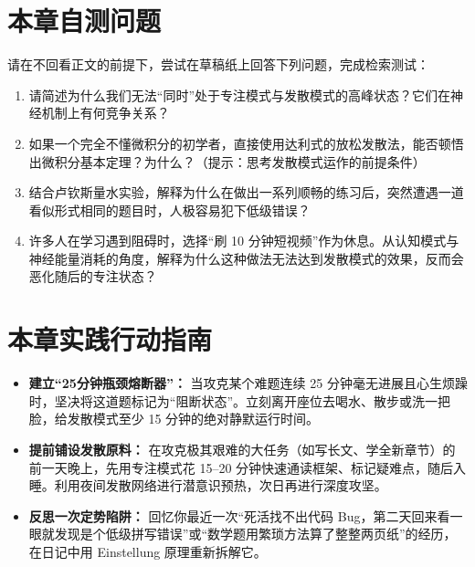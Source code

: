 \documentclass[12pt,a4paper,openany]{ctexbook}
\begin{document}
\section*{本章自测问题}
请在不回看正文的前提下，尝试在草稿纸上回答下列问题，完成检索测试：
\begin{enumerate}
    \item 请简述为什么我们无法“同时”处于专注模式与发散模式的高峰状态？它们在神经机制上有何竞争关系？
    \item 如果一个完全不懂微积分的初学者，直接使用达利式的放松发散法，能否顿悟出微积分基本定理？为什么？（提示：思考发散模式运作的前提条件）
    \item 结合卢钦斯量水实验，解释为什么在做出一系列顺畅的练习后，突然遭遇一道看似形式相同的题目时，人极容易犯下低级错误？
    \item 许多人在学习遇到阻碍时，选择“刷 10 分钟短视频”作为休息。从认知模式与神经能量消耗的角度，解释为什么这种做法无法达到发散模式的效果，反而会恶化随后的专注状态？
\end{enumerate}

\section*{本章实践行动指南}
\begin{practicebox}[本周刻意练习项目]
\begin{itemize}
    \item[$\square$] \textbf{建立“25分钟瓶颈熔断器”：} 当攻克某个难题连续 25 分钟毫无进展且心生烦躁时，坚决将这道题标记为“阻断状态”。立刻离开座位去喝水、散步或洗一把脸，给发散模式至少 15 分钟的绝对静默运行时间。

    \item[$\square$] \textbf{提前铺设发散原料：} 在攻克极其艰难的大任务（如写长文、学全新章节）的前一天晚上，先用专注模式花 15--20 分钟快速通读框架、标记疑难点，随后入睡。利用夜间发散网络进行潜意识预热，次日再进行深度攻坚。

    \item[$\square$] \textbf{反思一次定势陷阱：} 回忆你最近一次“死活找不出代码 Bug，第二天回来看一眼就发现是个低级拼写错误”或“数学题用繁琐方法算了整整两页纸”的经历，在日记中用 Einstellung 原理重新拆解它。
\end{itemize}
\end{practicebox}


\end{document}
